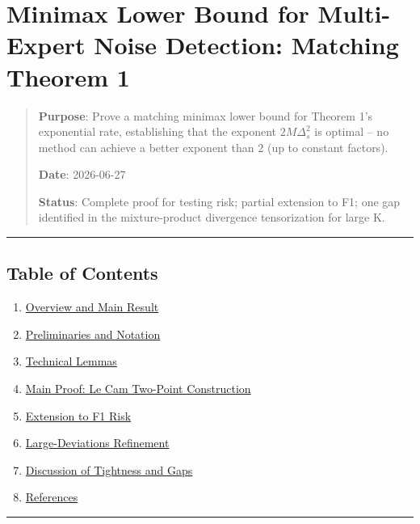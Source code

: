 \documentclass[
  12pt,
]{article}
\author{SCX}
\date{2026}
\providecommand{\tightlist}{%
  \setlength{\itemsep}{0pt}\setlength{\parskip}{0pt}}
\begin{document}
\section{Minimax Lower Bound for Multi-Expert Noise Detection: Matching
Theorem
1}\label{minimax-lower-bound-for-multi-expert-noise-detection-matching-theorem-1}

\begin{quote}
\textbf{Purpose}: Prove a matching minimax lower bound for Theorem 1's
exponential rate, establishing that the exponent \(2M\Delta_s^2\) is
optimal -- no method can achieve a better exponent than \(2\) (up to
constant factors).

\textbf{Date}: 2026-06-27

\textbf{Status}: Complete proof for testing risk; partial extension to
F1; one gap identified in the mixture-product divergence tensorization
for large K.
\end{quote}

\begin{center}\rule{0.5\linewidth}{0.5pt}\end{center}

\subsection{Table of Contents}\label{table-of-contents}

\begin{enumerate}
\def\labelenumi{\arabic{enumi}.}
\tightlist
\item
  \hyperref[1-overview-and-main-result]{Overview and Main Result}
\item
  \hyperref[2-preliminaries-and-notation]{Preliminaries and Notation}
\item
  \hyperref[3-technical-lemmas]{Technical Lemmas}
\item
  \hyperref[4-main-proof-le-cam-two-point-construction]{Main Proof: Le
  Cam Two-Point Construction}
\item
  \hyperref[5-extension-to-f1-risk]{Extension to F1 Risk}
\item
  \hyperref[6-large-deviations-refinement]{Large-Deviations Refinement}
\item
  \hyperref[7-discussion-of-tightness-and-gaps]{Discussion of Tightness
  and Gaps}
\item
  \hyperref[8-references]{References}
\end{enumerate}

\begin{center}\rule{0.5\linewidth}{0.5pt}\end{center}
\end{document}
